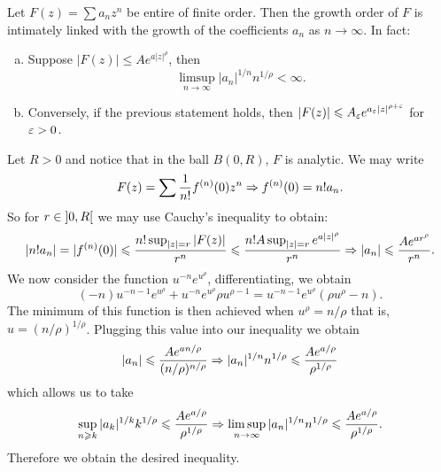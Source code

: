 \documentclass[12pt]{memoir}
\begin{document}
\begin{Ej}
  Let $F(z)=\sum a_nz^n$ be entire of finite order. Then the growth order of $F$ is intimately linked with the growth of the coefficients $a_n$ as $n\to\infty$. In fact:
  \begin{enumerate}[(a)]
    \itemsep=-0.4em
    \item Suppose $|F(z)|\leq Ae^{a|z|^\rho}$, then 
    $$\limsup_{n\to\infty}|a_n|^{1/n}n^{1/\rho}<\infty.$$
    \item Conversely, if the previous statement holds, then $|F(z)|\leqslant A_{\varepsilon}e^{a_\varepsilon|z|^{\rho+\varepsilon}}$ for $\varepsilon>0$.
  \end{enumerate}
    \end{Ej}
\begin{ptcbr}
Let $R>0$ and notice that in the ball $B(0,R)$, $F$ is analytic. We may write 
$$F(z)=\sum \frac{1}{n!}f^{(n)}(0)z^n\Rightarrow f^{(n)}(0)=n!a_n.$$
So for $r\in\left\rbrack0,R\right\lbrack$ we may use Cauchy's inequality to obtain:
$$|n!a_n|=|f^{(n)}(0)|\leqslant\frac{n!\sup_{|z|=r}|F(z)|}{r^n}\leqslant \frac{n!A\sup_{|z|=r}e^{a|z|^\rho}}{r^n}\Rightarrow |a_n|\leqslant\frac{Ae^{ar^\rho}}{r^n}.$$
We now consider the function $u^{-n}e^{u^\rho}$, differentiating, we obtain 
$$(-n)u^{-n-1}e^{u^\rho}+u^{-n}e^{u^\rho}\rho u^{\rho-1}=u^{-n-1}e^{u^\rho}(\rho u^{\rho}-n).$$
The minimum of this function is then achieved when $u^\rho=n/\rho$ that is, $u=(n/\rho)^{1/\rho}$. Plugging this value into our inequality we obtain 
$$|a_n|\leqslant\frac{Ae^{an/\rho}}{(n/\rho)^{n/\rho}}\Rightarrow |a_n|^{1/n}n^{1/\rho}\leqslant\frac{Ae^{a/\rho}}{\rho^{1/\rho}}$$
which allows us to take 
$$\sup_{n\geqslant k}|a_k|^{1/k}k^{1/\rho}\leqslant\frac{Ae^{a/\rho}}{\rho^{1/\rho}}\Rightarrow \limsup_{n\to\infty}|a_n|^{1/n}n^{1/\rho}\leqslant \frac{Ae^{a/\rho}}{\rho^{1/\rho}}.$$
Therefore we obtain the desired inequality.
\end{ptcbr}

\begin{Ej}[Re-do of 5.2(a)]
    
\end{Ej}
\end{document}
